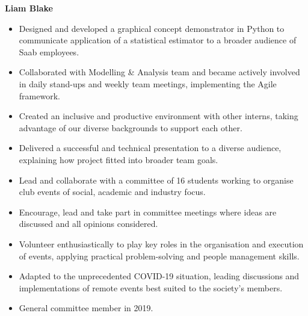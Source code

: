 \documentclass[11pt,a4paper,academicons]{altacv}
\begin{document}
\newpage

%
\begin{fullwidth}
	\color{emphasis}%
	{\fontsize{24pt}{24pt}\selectfont\bfseries{Liam Blake}}

	\divider
\end{fullwidth}%

\begin{itemize}
	\item Designed and developed a graphical concept demonstrator in Python to communicate application of a statistical estimator to a broader audience of Saab employees.

	\item Collaborated with Modelling \& Analysis team and became actively involved in daily stand-ups and weekly team meetings, implementing the Agile framework.

	\item Created an inclusive and productive environment with other interns, taking advantage of our diverse backgrounds to support each other.

	\item Delivered a successful and technical presentation to a diverse audience, explaining how project fitted into broader team goals.
 
\end{itemize}


\vspace{-3.55mm}
\begin{itemize}
	\item Lead and collaborate with a committee of 16 students working to organise club events of social, academic and industry focus.

	\item Encourage, lead and take part in committee meetings where ideas are discussed and all opinions considered.

	\item Volunteer enthusiastically to play key roles in the organisation and execution of events, applying practical problem-solving and people management skills.

	\item Adapted to the unprecedented COVID-19 situation, leading discussions and implementations of remote events best suited to the society's members.
 
	\item General committee member in 2019.
\end{itemize}
\end{document}
